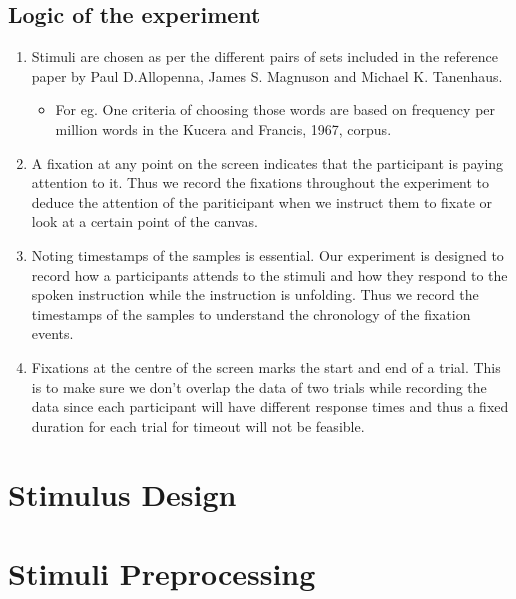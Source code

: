 \documentclass[
  a4paper,
]{article}
\providecommand{\tightlist}{%
  \setlength{\itemsep}{0pt}\setlength{\parskip}{0pt}}\usepackage{longtable,booktabs,array}
\begin{document}
\hypertarget{logic-of-the-experiment}{%
\subsection{Logic of the experiment}\label{logic-of-the-experiment}}

\begin{enumerate}
\def\labelenumi{\arabic{enumi}.}
\item
  Stimuli are chosen as per the different pairs of sets included in the
  reference paper by Paul D.Allopenna, James S. Magnuson and Michael K.
  Tanenhaus.

  \begin{itemize}
  \tightlist
  \item
    For eg. One criteria of choosing those words are based on frequency
    per million words in the Kucera and Francis, 1967, corpus.
  \end{itemize}
\item
  A fixation at any point on the screen indicates that the participant
  is paying attention to it. Thus we record the fixations throughout the
  experiment to deduce the attention of the pariticipant when we
  instruct them to fixate or look at a certain point of the canvas.
\item
  Noting timestamps of the samples is essential. Our experiment is
  designed to record how a participants attends to the stimuli and how
  they respond to the spoken instruction while the instruction is
  unfolding. Thus we record the timestamps of the samples to understand
  the chronology of the fixation events.
\item
  Fixations at the centre of the screen marks the start and end of a
  trial. This is to make sure we don't overlap the data of two trials
  while recording the data since each participant will have different
  response times and thus a fixed duration for each trial for timeout
  will not be feasible.
\end{enumerate}

\hypertarget{stimulus-design}{%
\section{Stimulus Design}\label{stimulus-design}}

\hypertarget{stimuli-preprocessing}{%
\section{Stimuli Preprocessing}\label{stimuli-preprocessing}}
\end{document}
